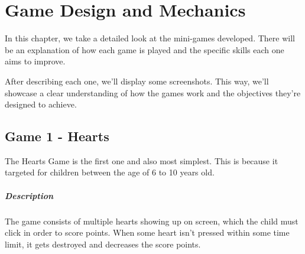 \raggedbottom
\chapter{Game Design and Mechanics}
\label{cha:games_to_be_developed}


In this chapter, we take a detailed look at the mini-games developed. There will be an explanation of how each game is played and the specific skills each one aims to improve.

After describing each one, we'll display some screenshots. This way, we'll showcase a clear understanding of how the games work and the objectives they’re designed to achieve.



\newpage
\section{Game 1 - Hearts}

The Hearts Game is the first one and also most simplest. This is because it targeted for children between the age of 6 to 10 years old.

\paragraph{Description}
The game consists of multiple hearts showing up on screen, which the child must click in order to score points. When some heart isn't pressed within some time limit, it gets destroyed and decreases the score points.

